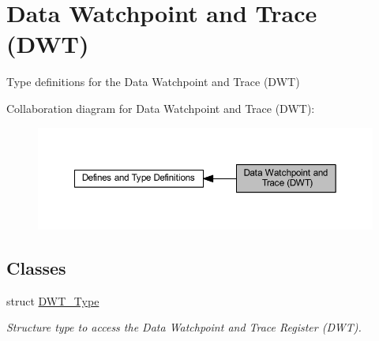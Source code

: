 \hypertarget{group___c_m_s_i_s___d_w_t}{}\section{Data Watchpoint and Trace (D\+WT)}
\label{group___c_m_s_i_s___d_w_t}


Type definitions for the Data Watchpoint and Trace (D\+WT)  


Collaboration diagram for Data Watchpoint and Trace (D\+WT)\+:
\nopagebreak
\begin{figure}[H]
\begin{center}
\leavevmode
\includegraphics[width=350pt]{group___c_m_s_i_s___d_w_t}
\end{center}
\end{figure}
\subsection*{Classes}
\begin{DoxyCompactItemize}
\item 
struct \hyperlink{struct_d_w_t___type}{D\+W\+T\+\_\+\+Type}
\begin{DoxyCompactList}\small\item\em Structure type to access the Data Watchpoint and Trace Register (D\+WT). \end{DoxyCompactList}\end{DoxyCompactItemize}
